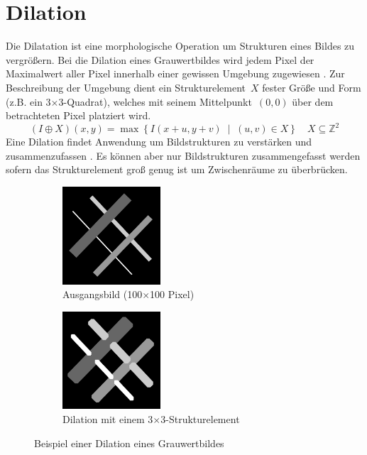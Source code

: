 \section{Dilation}
\writtenby{\dcauthornameewie}%
Die Dilatation ist eine morphologische Operation um Strukturen eines Bildes zu vergrößern.
Bei die Dilation eines Grauwertbildes wird jedem Pixel der Maximalwert aller Pixel innerhalb einer gewissen Umgebung zugewiesen \cite[Kapitel~3.5]{steinmueller2008}.
Zur Beschreibung der Umgebung dient ein Strukturelement~$X$ fester Größe und Form (z.B. ein 3$\times$3-Quadrat), welches mit seinem Mittelpunkt~$(0,0)$ über dem betrachteten Pixel platziert wird.
\begin{equation}
  (I\oplus X)(x,y)= \max \left\{ I(x+u,y+v) \;\middle|\; (u,v) \in X \right\} \quad X \subseteq \mathbb{Z}^2
\end{equation}
Eine Dilation findet Anwendung um Bildstrukturen zu verstärken und zusammenzufassen \cite[Kapitel~3.1]{steinmueller2008}.
Es können aber nur Bildstrukturen zusammengefasst werden sofern das Strukturelement groß genug ist um Zwischenräume zu überbrücken.

\begin{figure}[H]
  \label{fig:dilation}
  \centering
  \begin{subfigure}[t]{.49\linewidth}
    \centering
    \includegraphics[width=0.4\textwidth]{img/basics/dilation/before}
    \caption{Ausgangsbild (100$\times$100 Pixel)}
  \end{subfigure}
  \begin{subfigure}[t]{.49\linewidth}
    \centering
    \includegraphics[width=0.4\textwidth]{img/basics/dilation/after}
    \caption{Dilation mit einem 3$\times$3-Strukturelement}
  \end{subfigure}
  \caption{Beispiel einer Dilation eines Grauwertbildes}
\end{figure}

